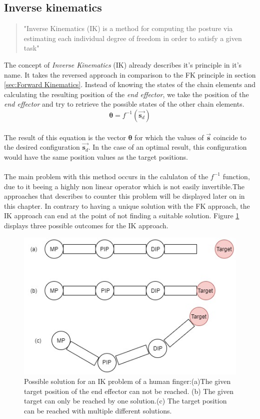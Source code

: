 \subsection{Inverse kinematics}
\label{sec:inverse kinematics}
\begin{quote}"Inverse Kinematics (IK) is a method for computing the posture via estimating each individual degree of freedom in order to satisfy a given task" \cite{AndreasAristidouandJoanLasenby.2009}\end{quote}
The concept of \textit{Inverse Kinematics}  (IK) already describes it's principle in it's name. It takes the reversed approach in comparison to the FK principle in section \ref{sec:Forward Kinematics}. Instead of knowing the states of the chain elements and calculating the resulting position of the \textit{end effector}, we take the position of the \textit{end effector} and try to retrieve the possible states of the other chain elements. \\
\begin{equation}
\label{ik problem formula}
\pmb{\theta}=f^{-1}(\vec{\textbf{s}_{d}})
\end{equation}
\\The result of this equation is the vector $\pmb{\theta}$ for which the values of $\vec{\textbf{s}}$ coincide to the desired configuration $\vec{\textbf{s}_{d}}$. In the case of an optimal result, this configuration would have the same position values as the target positions.\\\\ The main problem with this method occurs in the calulaton of the $f^{-1}$ function, due to it beeing a highly non linear operator which is not easily invertible.The approaches that \cite{AndreasAristidouandJoanLasenby.2009} describes to counter this problem will be displayed later on in this chapter.
In contrary to having a unique solution with the FK approach, the IK approach can end at the point of not finding a suitable solution. Figure \ref{IkSolutions} displays three possible outcomes for the IK approach.
\begin{figure}[H]
\centering
\includegraphics[scale=0.6]{images/Ik_figure.jpg}
\caption{Possible solution for an IK problem of a human finger:(a)The given target position of the end effector can not be reached. (b) The given target can only be reached by one solution.(c) The target position can be reached with multiple different solutions.}
\label{IkSolutions}
\end{figure}
